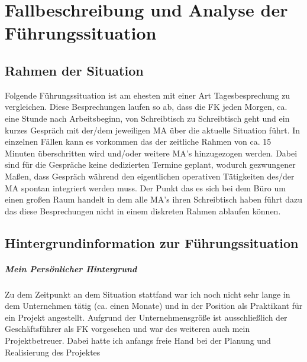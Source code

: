 \chapter{Fallbeschreibung und Analyse der Führungssituation}
\label{chap:hauptteil}

\section{Rahmen der Situation}
Folgende Führungssituation ist am ehesten mit einer Art Tagesbesprechung zu vergleichen.
Diese Besprechungen laufen so ab, dass die \ac{FK} jeden Morgen, ca. eine Stunde nach Arbeitsbeginn, von Schreibtisch zu Schreibtisch geht und ein kurzes Gespräch   mit der/dem jeweiligen \ac{MA} über die aktuelle Situation führt. 
In einzelnen Fällen kann es vorkommen das der zeitliche Rahmen von ca. 15 Minuten überschritten wird und/oder weitere \ac{MA}'s hinzugezogen werden.
Dabei sind für die Gespräche keine dedizierten Termine geplant, wodurch gezwungener Maßen, dass Gespräch während den eigentlichen operativen Tätigkeiten des/der \ac{MA} spontan integriert werden muss. 
Der Punkt das es sich bei dem Büro um einen großen Raum handelt in dem alle \ac{MA}'s ihren Schreibtisch haben führt dazu das diese Besprechungen nicht in einem diskreten Rahmen ablaufen können.

\pagebreak

\section{Hintergrundinformation zur Führungssituation}

\paragraph*{Mein Persönlicher Hintergrund}
Zu dem Zeitpunkt an dem Situation stattfand war ich noch nicht sehr lange in dem Unternehmen tätig (ca. einen Monate) und in der Position als Praktikant für ein  Projekt angestellt. 
Aufgrund der Unternehmensgröße ist ausschließlich der Geschäftsführer als \ac{FK} vorgesehen und war des weiteren auch mein Projektbetreuer. 
Dabei hatte ich anfangs freie Hand bei der Planung und Realisierung des Projektes 

